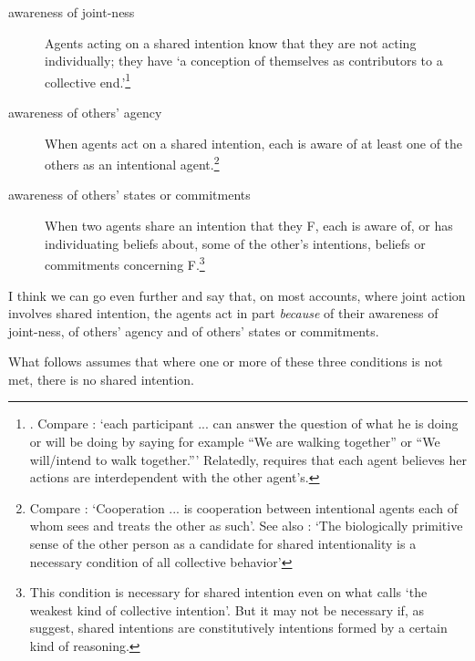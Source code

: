\documentclass[12pt,\papersize]{extarticle}
\begin{document}
\begin{description}

\item[awareness of joint-ness] Agents acting on a shared intention know that they are not acting individually; they have `a conception of themselves as contributors to a collective end.'\footnote{
	\citet[p.\ 10]{Kutz:2000si}.  Compare \citet[p.\ 361]{Roth:2004ki}: `each participant ... can answer the question of what he is doing or will be doing by saying for example ``We are walking together'' or ``We will/intend to walk together.''' 
Relatedly, \citet[p. 56]{miller_social_2001} requires that each agent believes her actions are interdependent with the other agent's.
}

\item[awareness of others' agency]  When agents act on a shared intention, each is aware of at least one of the others as an intentional agent.\footnote{
	Compare \citet[p.\ 333]{Bratman:1992mi}: `Cooperation ... is cooperation between intentional agents each of whom sees and treats the other as such'.  See also \citet[p.\ 105]{Searle:1990em}: `The biologically primitive sense of the other person as a candidate for shared intentionality is a necessary condition of all collective behavior' 
}

\item[awareness of others' states or commitments] When two agents share an intention that they F, each is aware of, or has individuating beliefs about, some of the other's intentions, beliefs or commitments concerning F.\footnote{
This condition is necessary for shared intention even on what \citet[p.\ 40]{tuomela_collective_2000} calls `the weakest kind of collective intention'.  But it may not be necessary if, as \citet{Gold:2007zd} suggest, shared intentions are constitutively intentions formed by a certain kind of reasoning.
}

\end{description}
%
I think we can go even further and say that, 
on most accounts,
where joint action involves shared intention, the agents act in part \emph{because} of their awareness of joint-ness, of others' agency and of others' states or commitments.  


What follows assumes that where one or more of these three conditions is not met, there is no shared intention. 
\end{document}
